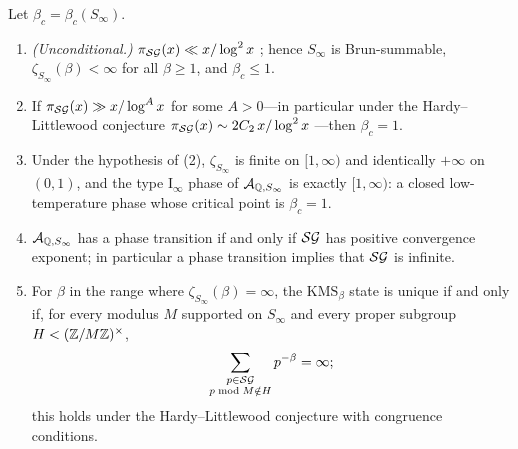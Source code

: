 \begin{theorem}\label{Main:thm:sg}
Let $\beta_c=\beta_c(S_\infty)$.
\begin{enumerate}
\item \emph{(Unconditional.)} $\pi_{\mathcal{SG}}(x)\ll x/\log^2x$ \cite{HR}; hence
$S_\infty$ is Brun-summable, $\zeta_{S_\infty}(\beta)<\infty$ for all
$\beta\ge1$, and $\beta_c\le1$.
\item If $\pi_{\mathcal{SG}}(x)\gg x/\log^Ax$ for some $A>0$---in particular under the
Hardy--Littlewood conjecture $\pi_{\mathcal{SG}}(x)\sim2C_2\,x/\log^2x$ \cite{HL}---then
$\beta_c=1$.
\item Under the hypothesis of (2), $\zeta_{S_\infty}$ is finite on $[1,\infty)$
and identically $+\infty$ on $(0,1)$, and the type $\mathrm I_\infty$ phase of
$\mathcal{A}_{\mathbb{Q},S_\infty}$ is exactly $[1,\infty)$: a closed low-temperature phase
whose critical point is $\beta_c=1$.
\item $\mathcal{A}_{\mathbb{Q},S_\infty}$ has a phase transition if and only if $\mathcal{SG}$ has
positive convergence exponent; in particular a phase transition implies that
$\mathcal{SG}$ is infinite.
\item For $\beta$ in the range where $\zeta_{S_\infty}(\beta)=\infty$, the
$\mathrm{KMS}_\beta$ state is unique if and only if, for every modulus $M$
supported on $S_\infty$ and every proper subgroup $H<(\mathbb{Z}/M\mathbb{Z})^\times$,
\[
\sum_{\substack{p\in\mathcal{SG}\\ p\bmod M\notin H}}p^{-\beta}=\infty ;
\]
this holds under the Hardy--Littlewood conjecture with congruence conditions.
\end{enumerate}
\end{theorem}

